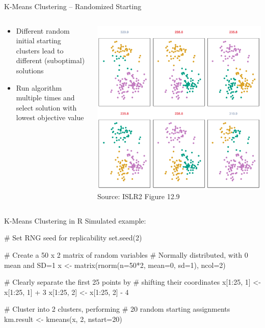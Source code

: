 \documentclass[ignorenonframetext,xcolor=x11names]{beamer}
\begin{document}
\begin{frame}{K-Means Clustering -- Randomized Starting}
\begin{columns}
\begin{column}{0.35\textwidth}
\begin{itemize}
   \item Different random initial starting clusters lead to different (suboptimal) solutions 
   \item Run algorithm multiple times and select solution with lowest objective value
\end{itemize}
\end{column}
\begin{column}{0.65\textwidth}
\centering
\includegraphics[width=\textwidth]{../class11/Figures_Chapters_7-13/Chapter12/12_9.pdf} \\

\scriptsize Source: ISLR2 Figure 12.9
\end{column}
\end{columns}
\end{frame}

\begin{frame}[fragile]{K-Means Clustering in R}
Simulated example:
\begin{Rcode}
# Set RNG seed for replicability
set.seed(2)

# Create a 50 x 2 matrix of random variables 
# Normally distributed, with 0 mean and SD=1
x <- matrix(rnorm(n=50*2, mean=0, sd=1), ncol=2)

# Clearly separate the first 25 points by
# shifting their coordinates
x[1:25, 1] <- x[1:25, 1] + 3
x[1:25, 2] <- x[1:25, 2] - 4

# Cluster into 2 clusters, performing
# 20 random starting assignments
km.result <- kmeans(x, 2, nstart=20)
\end{Rcode}
\end{frame}
\end{document}

